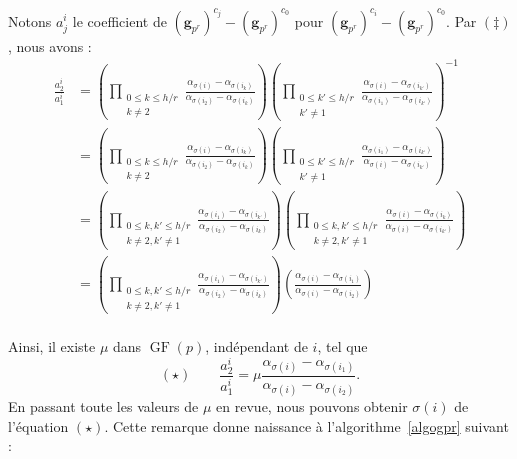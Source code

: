 \documentclass[a4paper, titlepage, 11pt]{article}
\theoremstyle{definition}
\theoremstyle{remark}
\def\gf{\operatorname{GF}}
\def\mbf#1{\mathbf{#1}}
\begin{document}
Notons $a_j^i$ le coefficient de $(\mbf g_{p^r})^{c_{{j}}} - (\mbf g_{p^r})^{c_{0}}$ pour $(\mbf g_{p^r})^{c_{i}} - (\mbf g_{p^r})^{c_{0}}$. Par $(\ddagger)$, nous avons :
\begin{align*}
\frac{a_2^i}{a_1^i} &= \left(\prod_{\substack{0\leqslant k\leqslant h/r \\ k \neq 2}} \frac{\alpha_{\sigma(i)}-\alpha_{\sigma(i_k)}}{\alpha_{\sigma(i_2)}-\alpha_{\sigma(i_k)}} \right)\left(\prod_{\substack{0\leqslant k'\leqslant h/r \\ k' \neq 1}} \frac{\alpha_{\sigma(i)}-\alpha_{\sigma(i_{k'})}}{\alpha_{\sigma(i_1)}-\alpha_{\sigma(i_{k'})}} \right)^{-1} \\
&= \left(\prod_{\substack{0\leqslant k\leqslant h/r \\ k \neq 2}} \frac{\alpha_{\sigma(i)}-\alpha_{\sigma(i_k)}}{\alpha_{\sigma(i_2)}-\alpha_{\sigma(i_k)}} \right)\left(\prod_{\substack{0\leqslant k' \leqslant h/r \\ k' \neq 1}} \frac{\alpha_{\sigma(i_1)}-\alpha_{\sigma(i_{k'})}}{\alpha_{\sigma(i)}-\alpha_{\sigma(i_{k'})}} \right) \\
&= \left(\prod_{\substack{0\leqslant k, k'\leqslant h/r \\ k \neq 2, k' \neq 1}} \frac{\alpha_{\sigma(i_1)}-\alpha_{\sigma(i_{k'})}}{\alpha_{\sigma(i_2)}-\alpha_{\sigma(i_k)}} \right) \left(\prod_{\substack{0\leqslant k, k'\leqslant h/r \\ k \neq 2, k' \neq 1}} \frac{\alpha_{\sigma(i)}-\alpha_{\sigma(i_k)}}{\alpha_{\sigma(i)}-\alpha_{\sigma(i_{k'})}} \right) \\
&= \left(\prod_{\substack{0\leqslant k, k'\leqslant h/r \\ k \neq 2, k' \neq 1}} \frac{\alpha_{\sigma(i_1)}-\alpha_{\sigma(i_{k'})}}{\alpha_{\sigma(i_2)}-\alpha_{\sigma(i_k)}} \right) \left(\frac{\alpha_{\sigma(i)}-\alpha_{\sigma(i_1)}}{\alpha_{\sigma(i)}-\alpha_{\sigma(i_2)}} \right) \\
\end{align*}

Ainsi, il existe $\mu$ dans $\gf(p)$, indépendant de $i$, tel que 
$$(\star) \qquad\frac{a_2^i}{a_1^i} = \mu \frac{\alpha_{\sigma(i)}-\alpha_{\sigma(i_1)}}{\alpha_{\sigma(i)}-\alpha_{\sigma(i_2)}}.$$
En passant toute les valeurs de $\mu$ en revue, nous pouvons obtenir $\sigma(i)$ de l'équation $(\star)$. Cette remarque donne naissance à l'algorithme~\ref{algogpr} suivant :
\end{document}
